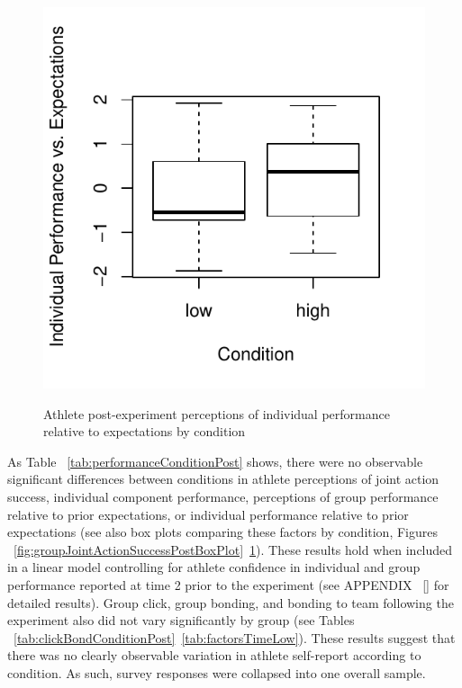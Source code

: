 \begin{figure}
  \centering
      \includegraphics[width=0.5\linewidth,keepaspectratio] {images/indPerfExpPostBoxPlot-1}
              \label{fig:indPerfExpPostBoxPlot}
              \caption{Athlete post-experiment perceptions of individual performance relative to expectations by condition}
\end{figure}


  \begin{landscape}
    \centering
      
   \end{landscape}
\restoregeometry


As Table ~\ref{tab:performanceConditionPost} shows, there were no observable significant differences between conditions in athlete perceptions of joint action success, individual component performance, perceptions of group performance relative to prior expectations, or individual performance relative to prior expectations (see also box plots comparing these factors by condition, Figures ~\ref{fig:groupJointActionSuccessPostBoxPlot}\nobreakdash~\ref{fig:indPerfExpPostBoxPlot}). These results hold when included in a linear model controlling for athlete confidence in individual and group performance reported at time 2 prior to the experiment (see APPENDIX ~\ref{} for detailed results). Group click, group bonding, and bonding to team following the experiment also did not vary significantly by group (see Tables ~\ref{tab:clickBondConditionPost}\nobreakdash~\ref{tab:factorsTimeLow}).  These results suggest that there was no clearly observable variation in athlete self-report according to condition.  As such, survey responses were collapsed into one overall sample.


  \begin{landscape}
    \centering
      
   \end{landscape}
\restoregeometry



